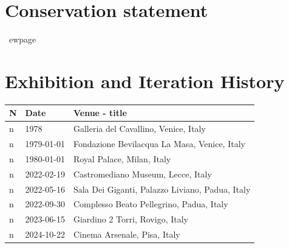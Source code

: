 \documentclass[a4paper,12pt]{article}
\begin{document}
    \section*{Conservation statement}
    
    
    \
ewpage
    \section*{Exhibition and Iteration History}
    \begin{longtable}{|p{}|p{}|p{}|} 
    \hline
    \textbf{N} & \textbf{Date} & \textbf{Venue - title} \\ 
    \hline
    \endfirsthead
    n & 1978 & Galleria del Cavallino, Venice, Italy\\\hline n & 1979-01-01 & Fondazione Bevilacqua La Masa, Venice, Italy\\\hline n & 1980-01-01 & Royal Palace, Milan, Italy\\\hline n & 2022-02-19 & Castromediano Museum, Lecce, Italy\\\hline n & 2022-05-16 & Sala Dei Giganti, Palazzo Liviano, Padua, Italy\\\hline n & 2022-09-30 & Complesso Beato Pellegrino, Padua, Italy\\\hline n & 2023-06-15 & Giardino 2 Torri, Rovigo, Italy\\\hline n & 2024-10-22 & Cinema Arsenale, Pisa, Italy\\\hline 

    \end{longtable}
    
\end{document}
